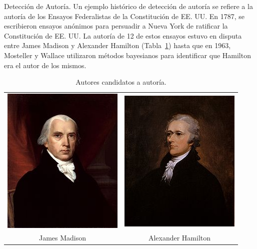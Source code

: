 \begin{example}
Detección de Autoría. Un ejemplo histórico de detección de autoría se refiere a la autoría de los Ensayos Federalistas de la Constitución de EE. UU. En 1787, se escribieron ensayos anónimos para persuadir a Nueva York de ratificar la Constitución de EE. UU. La autoría de 12 de estos ensayos estuvo en disputa entre James Madison y Alexander Hamilton (Tabla~\ref{fig:autores}) hasta que en 1963, Mosteller y Wallace \cite{mosteller1963inference} utilizaron métodos bayesianos para identificar que Hamilton era el autor de los mismos.


\begin{table}[h]
    \centering
    \begin{tabular}{cc}
        \includegraphics[height=0.3\textwidth]{pics/madison.png} & \includegraphics[height=0.3\textwidth]{pics/hamilton.png} \\
        James Madison & Alexander Hamilton \\
    \end{tabular}
    \caption{Autores candidatos a autoría.}
    \label{fig:autores}
\end{table}



\end{example}


